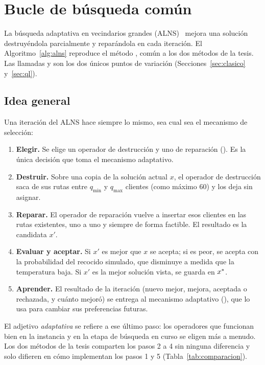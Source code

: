 \section{Bucle de búsqueda común}
\label{sec:base}

La búsqueda adaptativa en vecindarios grandes (ALNS)~\cite{ropke2006,pisinger2007} mejora una
solución destruyéndola parcialmente y reparándola en cada iteración. El
Algoritmo~\ref{alg:alns} reproduce el método , común a los dos métodos de la
tesis. Las llamadas  y  son los dos únicos puntos de variación
(Secciones~\ref{sec:clasico} y~\ref{sec:ql}).

\subsection{Idea general}
\label{sec:idea}

Una iteración del ALNS hace siempre lo mismo, sea cual sea el mecanismo de selección:
\begin{enumerate}
\item \textbf{Elegir.} Se elige un operador de destrucción y uno de reparación
(). Es la única decisión que toma el mecanismo adaptativo.
\item \textbf{Destruir.} Sobre una copia de la solución actual $x$, el operador de
destrucción saca de sus rutas entre $q_{\min}$ y $q_{\max}$ clientes (como máximo $60$) y los
deja sin asignar.
\item \textbf{Reparar.} El operador de reparación vuelve a insertar esos clientes en las rutas
existentes, uno a uno y siempre de forma factible. El resultado es la candidata $x'$.
\item \textbf{Evaluar y aceptar.} Si $x'$ es mejor que $x$ se acepta; si es peor, se acepta
con la probabilidad del recocido simulado, que disminuye a medida que la temperatura baja. Si
$x'$ es la mejor solución vista, se guarda en $x^{*}$.
\item \textbf{Aprender.} El resultado de la iteración (nuevo mejor, mejora, aceptada o
rechazada, y cuánto mejoró) se entrega al mecanismo adaptativo (), que lo usa
para cambiar sus preferencias futuras.
\end{enumerate}
El adjetivo \emph{adaptativa} se refiere a ese último paso: los operadores que funcionan bien
en la instancia y en la etapa de búsqueda en curso se eligen más a menudo. Los dos métodos de
la tesis comparten los pasos 2 a 4 sin ninguna diferencia y solo difieren en cómo implementan
los pasos 1 y 5 (Tabla~\ref{tab:comparacion}).


